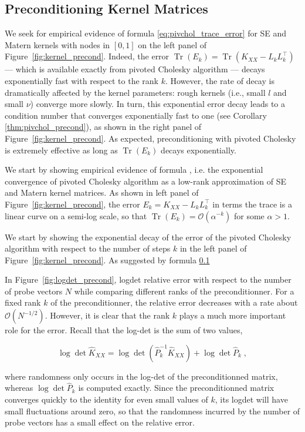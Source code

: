 \documentclass{article}
\DeclareMathOperator{\trace}{Tr}
\begin{document}
\subsection{Preconditioning Kernel Matrices}

We seek for empirical evidence of formula \eqref{eq:pivchol_trace_error} for SE and Matern kernels with nodes in $[0, 1]$ on the left panel of Figure~\ref{fig:kernel_precond}. Indeed, the error $\trace(E_k) = \trace(K_{XX} - L_k L_k^\top)$ --- which is available exactly from pivoted Cholesky algorithm --- decays exponentially fast with respect to the rank $k$. However, the rate of decay is dramatically affected by the kernel parameters: rough kernels (i.e., small $l$ and small $\nu$) converge more slowly. In turn, this exponential error decay leads to a condition number that converges exponentially fast to one (see Corollary \ref{thm:pivchol_precond}), as shown in the right panel of Figure~\ref{fig:kernel_precond}. As expected, preconditioning with pivoted Cholesky is extremely effective as long as $\trace(E_k)$ decays exponentially. 

We start by showing empirical evidence of formula , i.e. the exponential convergence of pivoted Cholesky algorithm as a low-rank approximation of SE and Matern kernel matrices. As shown in left panel of Figure~\ref{fig:kernel_precond}, the error $E_k = K_{XX} - L_kL_k^\top$ in terms the trace is a linear curve on a semi-log scale, so that $\trace(E_k) = \mathcal O(\alpha^{-k})$ for some $\alpha > 1$.

We start by showing the exponential decay of the error of the pivoted Cholesky algorithm with respect to the number of steps $k$ in the left panel of Figure~\ref{fig:kernel_precond}. As suggested by formula \ref{}

In Figure~\ref{fig:logdet_precond}, logdet relative error with respect to the number of probe vectors $N$ while comparing different ranks of the preconditionner. For a fixed rank $k$ of the preconditionner, the relative error decreases with a rate about $\mathcal O(N^{-1/2})$. However, it is clear that the rank $k$ plays a much more important role for the error. Recall that the log-det is the sum of two values,

\begin{equation*}
    \log \det \widehat K_{XX} = \log\det\left(\widehat P_k^{-1} \widehat K_{XX} \right) + \log\det \widehat P_k \; ,
\end{equation*}

where randomness only occurs in the log-det of the preconditionned matrix, whereas $\log\det \widehat P_k$ is computed exactly. Since the preconditionned matrix converges quickly to the identity for even small values of $k$, its logdet will have small fluctuations around zero, so that the randomness incurred by the number of probe vectors has a small effect on the relative error.
\end{document}
